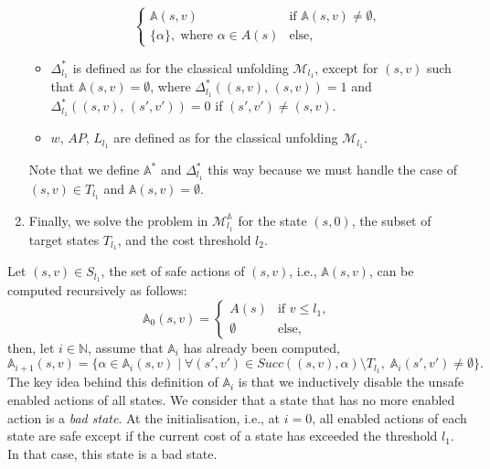 \begin{enumerate}
\begin{itemize}
\[\begin{cases}
        \mathbb{A}(s, v) & \text{if } \mathbb{A}(s, v) \neq \emptyset, \, \\
        \{\alpha\}, \; \text{where } \alpha \in A(s) & \text{else},
      \end{cases}
    \]
    \item $\Delta^*_{l_1}$ is defined as for the classical unfolding $\mathcal{M}_{l_1}$, except for $(s, v)$ such that $\mathbb{A}(s, v) = \emptyset$, where $\Delta^*_{l_1}((s, v),\, (s, v)) = 1$ and $\Delta^*_{l_1}((s, v), \, (s', v')) = 0$ if $(s', v') \neq (s, v)$.
    \item $w, \, AP, \, L_{l_1}$ are defined as for the classical unfolding $\mathcal{M}_{l_1}$.
  \end{itemize}
  Note that we define $\mathbb{A}^*$ and $\Delta_{l_1}^*$ this way because we must handle the case of $(s, v) \in T_{l_1}$ and $\mathbb{A}(s, v) = \emptyset$.
  \item Finally, we solve the \SSPE{} problem in $\mathcal{M}^\mathbb{A}_{l_1}$ for the state $(s, 0)$, the subset of target states $T_{l_1}$, and the cost threshold $l_2$.
\end{enumerate}
Let $(s, v) \in S_{l_1}$, the set of safe actions of $(s, v)$, i.e., $\mathbb{A}(s, v)$, can be computed recursively
as follows:
\[
  \mathbb{A}_0(s, v) = \begin{cases}
    A(s) & \text{if }v \leq l_1,\\
    \emptyset & \text{else},
  \end{cases}
\]
then, let $i \in \mathbb{N}$, assume that $\mathbb{A}_i$ has already been computed,
\[
  \mathbb{A}_{i+1}(s, v) = \{ \alpha \in \mathbb{A}_i(s, v) \; | \;
    \forall (s', v') \in Succ( (s, v), \alpha ) \setminus T_{l_1}, \; \mathbb{A}_i(s', v') \neq \emptyset \}.
\]
The key idea behind this definition of $\mathbb{A}_i$ is that we inductively disable the unsafe enabled actions of all states.
We consider that a state that has no more enabled action is a \textit{bad state}.
At the initialisation, i.e., at $i=0$, all enabled actions of each state are safe except if the current cost of a state has exceeded the threshold $l_1$. In that case, this state is a bad state.
